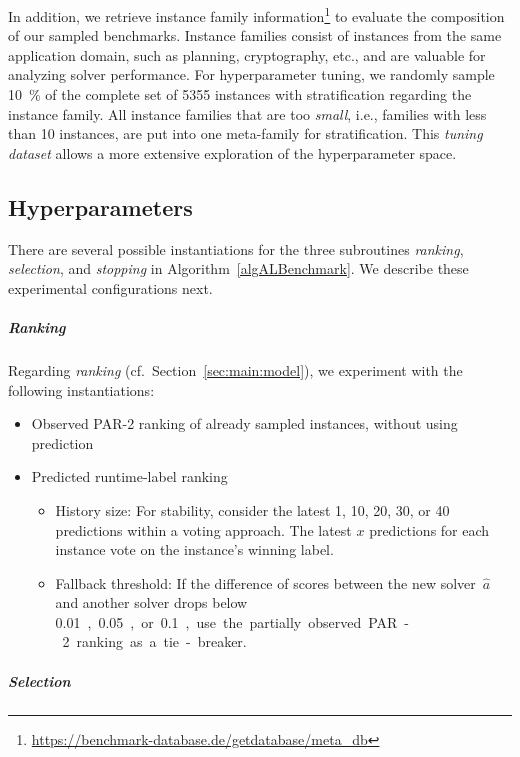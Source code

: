 \documentclass[sn-basic, Numbered]{sn-jnl} %
\begin{document}
In addition, we retrieve instance family information\footnote{\url{https://benchmark-database.de/getdatabase/meta_db}} to evaluate the composition of our sampled benchmarks.
Instance families consist of instances from the same application domain, such as planning, cryptography, etc., and are valuable for analyzing solver performance.
%
For hyperparameter tuning, we randomly sample \SI{10}{\%} of the complete set of 5355 instances with stratification regarding the instance family.
All instance families that are too \emph{small}, i.e., families with less than 10 instances, are put into one meta-family for stratification.
This \emph{tuning dataset} allows a more extensive exploration of the hyperparameter space.

\subsection{Hyperparameters}
\label{sec:exdesign:hyper}

There are several possible instantiations for the three subroutines \emph{ranking}, \emph{selection}, and \emph{stopping} in Algorithm~\ref{algALBenchmark}.
We describe these experimental configurations next.

\subparagraph{Ranking}

Regarding \emph{ranking} (cf.~Section~\ref{sec:main:model}), we experiment with the following instantiations:

\begin{itemize}\setlength{\itemsep}{1pt}
  \item Observed PAR-2 ranking of already sampled instances, without using prediction
  \item Predicted runtime-label ranking
  \vspace*{-1ex}
  \begin{itemize}\setlength{\itemsep}{1pt}
    \item
    History size: For stability, consider the latest 1, 10, 20, 30, or 40 predictions within a voting approach.
    The latest $x$ predictions for each instance vote on the instance's winning label.
    \item
    Fallback threshold: If the difference of scores between the new solver~$\hat{a}$ and another solver drops below \SI{0.01}, \SI{0.05}, or \SI{0.1}, use the partially observed PAR-2 ranking as a tie-breaker.
  \end{itemize}
\end{itemize}

\subparagraph{Selection}
\end{document}

